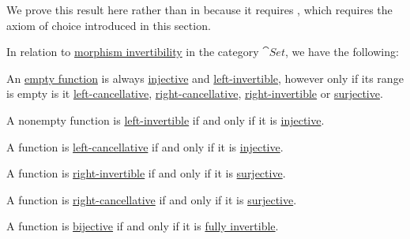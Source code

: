 \begin{proposition}\label{thm:function_invertibility_categorical}
  We prove this result here rather than in  because it requires , which requires the axiom of choice introduced in this section.

  In relation to \hyperref[def:morphism_invertibility]{morphism invertibility} in the category \hyperref[def:category_of_small_sets]{\( \cat{Set} \)}, we have the following:
  \begin{thmenum}
     An \hyperref[def:multi_valued_function/empty]{empty function} is always \hyperref[def:function_invertibility/injective]{injective} and \hyperref[def:morphism_invertibility/left_invertible]{left-invertible}, however only if its range is empty is it \hyperref[def:morphism_invertibility/left_cancellative]{left-cancellative}, \hyperref[def:morphism_invertibility/right_cancellative]{right-cancellative}, \hyperref[def:morphism_invertibility/right_invertible]{right-invertible} or \hyperref[def:function_invertibility/surjective]{surjective}.

     A nonempty function is \hyperref[def:morphism_invertibility/left_invertible]{left-invertible} if and only if it is \hyperref[def:function_invertibility/injective]{injective}.

     A function is \hyperref[def:morphism_invertibility/left_cancellative]{left-cancellative} if and only if it is \hyperref[def:function_invertibility/injective]{injective}.

     A function is \hyperref[def:morphism_invertibility/right_invertible]{right-invertible} if and only if it is \hyperref[def:function_invertibility/surjective]{surjective}.

     A function is \hyperref[def:morphism_invertibility/right_cancellative]{right-cancellative} if and only if it is \hyperref[def:function_invertibility/surjective]{surjective}.

     A function is \hyperref[def:function_invertibility/bijective]{bijective} if and only if it is \hyperref[def:morphism_invertibility/isomorphism]{fully invertible}.
  \end{thmenum}
\end{proposition}
